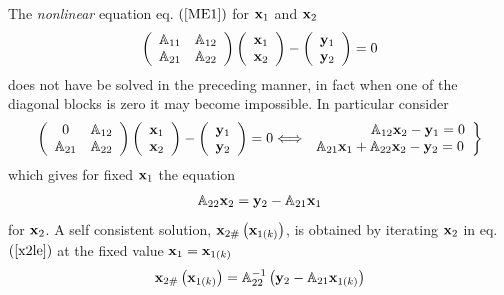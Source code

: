 The {\em nonlinear }equation eq. $\left( \ref{ME1}\right) $ for ${\bf x}_{1}$
and ${\bf x}_{2}$ 
\begin{equation}
\left( 
\begin{array}{cc}
{\Bbb A}_{11} & {\Bbb A}_{12} \\ 
{\Bbb A}_{21} & {\Bbb A}_{22}%
\end{array}%
\right) \left( 
\begin{array}{c}
{\bf x}_{1} \\ 
{\bf x}_{2}%
\end{array}%
\right) -\left( 
\begin{array}{c}
{\bf y}_{1} \\ 
{\bf y}_{2}%
\end{array}%
\right) =0
\end{equation}%
does not have be solved in the preceding manner, in fact when one of the
diagonal blocks is zero it may become impossible. In particular consider 
\begin{equation}
\left( 
\begin{array}{cc}
0 & {\Bbb A}_{12} \\ 
{\Bbb A}_{21} & {\Bbb A}_{22}%
\end{array}%
\right) \left( 
\begin{array}{c}
{\bf x}_{1} \\ 
{\bf x}_{2}%
\end{array}%
\right) -\left( 
\begin{array}{c}
{\bf y}_{1} \\ 
{\bf y}_{2}%
\end{array}%
\right) =0\Longleftrightarrow \left. 
\begin{array}{c}
\qquad \qquad {\Bbb A}_{12}{\bf x}_{2}-{\bf y}_{1}=0 \\ 
{\Bbb A}_{21}{\bf x}_{1}+{\Bbb A}_{22}{\bf x}_{2}-{\bf y}_{2}=0%
\end{array}%
\right\}
\end{equation}%
which gives for fixed ${\bf x}_{1}$ the equation 
\begin{equation}
{\Bbb A}_{22}{\bf x}_{2}={\bf y}_{2}-{\Bbb A}_{21}{\bf x}_{1}  \label{x2le}
\end{equation}%
for ${\bf x}_{2}$. A self consistent solution, ${\bf x}_{2\#}\left( {\bf x}%
_{1\left( k\right) }\right) $, is obtained by iterating ${\bf x}_{2}$ in eq. 
$\left( \ref{x2le}\right) $ at the fixed value ${\bf x}_{1}={\bf x}_{1\left(
k\right) }$ 
\begin{equation}
{\bf x}_{2\#}\left( {\bf x}_{1\left( k\right) }\right) ={\Bbb A}%
_{22}^{-1}\left( {\bf y}_{2}-{\Bbb A}_{21}{\bf x}_{1\left( k\right) }\right)
\label{x2}
\end{equation}%
